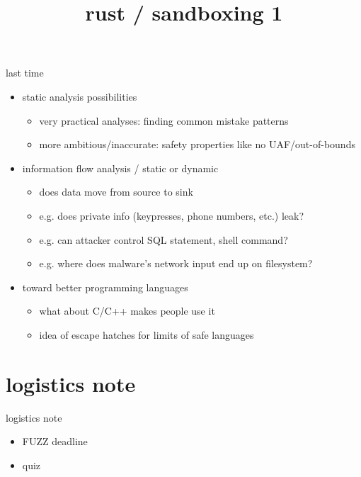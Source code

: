 \graphicspath{{./figures/}}
\title{rust / sandboxing 1}
\date{}

\begin{frame}
    \titlepage
\end{frame}

\begin{frame}{last time}
    \begin{itemize}
    \item static analysis possibilities
        \begin{itemize}
        \item very practical analyses: finding common mistake patterns
        \item more ambitious/inaccurate: safety properties like no UAF/out-of-bounds
        \end{itemize}
    \item information flow analysis / static or dynamic
        \begin{itemize}
        \item does data move from source to sink
        \item e.g. does private info (keypresses, phone numbers, etc.) leak?
        \item e.g. can attacker control SQL statement, shell command?
        \item e.g. where does malware's network input end up on filesystem?
        \end{itemize}
    \item toward better programming languages
        \begin{itemize}
        \item what about C/C++ makes people use it
        \item idea of escape hatches for limits of safe languages
        \end{itemize}
    \end{itemize}
\end{frame}

\section{logistics note}
\begin{frame}{logistics note}
    \begin{itemize}
    \item FUZZ deadline
    \item quiz
    \end{itemize}
\end{frame}

